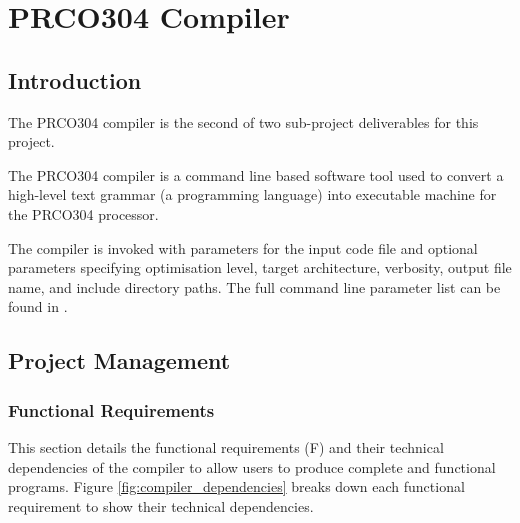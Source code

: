 \documentclass[11pt,a4paper]{report}
\newcommand{\scname}{PRCO304}
\begin{document}
\chapter{\scname{} Compiler}
{\hypersetup{linkcolor=black}
\startcontents[chapters]
}

\section{Introduction}
The \scname{} compiler is the second of two sub-project deliverables for this project.

The \scname{} compiler is a command line based software tool used to convert a high-level text grammar (a programming language) into executable machine for the \scname{} processor.

The compiler is invoked with parameters for the input code file and optional parameters specifying optimisation level, target architecture, verbosity, output file name, and include directory paths. The full command line parameter list can be found in {}.

\section{Project Management}
\subsection{Functional Requirements}
This section details the functional requirements (F) and their technical dependencies of the compiler to allow users to produce complete and functional programs. Figure \ref{fig:compiler_dependencies} breaks down each functional requirement to show their technical dependencies.
\end{document}
